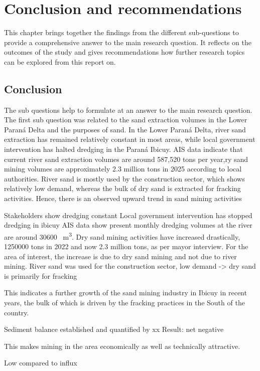 \chapter{Conclusion and recommendations}
\label{chapter:conclusion}
This chapter brings together the findings from the different sub-questions to provide a comprehensive answer to the main research question. It reflects on the outcomes of the study and gives recommendations how further research topics can be explored from this report on.

\section{Conclusion}
The sub questions help to formulate at an answer to the main research question. The first sub question was related to the sand extraction volumes in the Lower Paraná Delta and the purposes of sand. In the Lower Paraná Delta, river sand extraction has remained relatively constant in most areas, while local government intervention has halted dredging in the Paraná Ibicuy. AIS data indicate that current river sand extraction volumes are around 587,520 tons per year,ry sand mining volumes are approximately 2.3 million tons in 2025 according to local authorities.  River sand is mostly used by the construction sector, which shows relatively low demand, whereas the bulk of dry sand is extracted for fracking activities. Hence, there is an observed upward trend in sand mining activities 


Stakeholders show dredging constant
Local government intervention has stopped dredging in ibicuy
AIS data show present monthly dredging volumes at the river are around 30600 ~m\textsuperscript{3}. 
Dry sand mining activities have increased drastically, 1250000 tons in 2022 and now 2.3 million tons, as per mayor interview.
For the area of interest, the increase is due to dry sand mining and not due to river mining.
River sand was used for the construction sector, low demand -> dry sand is primarily for fracking




This indicates a further growth of the sand mining industry in Ibicuy in recent years, the bulk of which is driven by the fracking practices in the South of the country.

Sediment balance established and quantified by xx
Result: net negative

This makes mining in the area economically as well as technically attractive.


Low compared to influx




